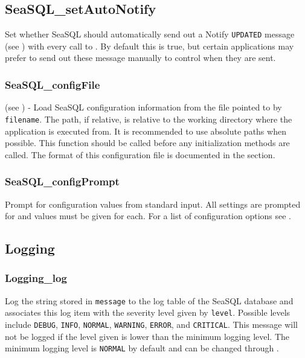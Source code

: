 \subsection{SeaSQL\_setAutoNotify} \label{apiseasqlnotify}
 Set whether SeaSQL should
automatically send out a Notify \texttt{UPDATED} message (see
) with every call to
. By default this is true,
but certain applications may prefer to send out these message manually to
control when they are sent.

\subsubsection{SeaSQL\_configFile} \label{apiseasqlconfigfile}
 \deprecated{} (see
) - Load SeaSQL
configuration information from the file pointed to by \texttt{filename}. The
path, if relative, is relative to the working directory where the application is
executed from. It is recommended to use absolute paths when possible. This
function should be called before any initialization methods are called. The
format of this configuration file is documented in the
 section.

\subsubsection{SeaSQL\_configPrompt} \label{apiseasqlconfigprompt}
 Prompt for configuration values from
standard input. All settings are prompted for and values must be given for
each. For a list of configuration options see
.


\subsection{Logging} \label{apilogging}
\subsubsection{Logging\_log} \label{apilogginglog}
 Log the string stored in
\texttt{message} to the log table of the SeaSQL database and associates this log
item with the severity level given by \texttt{level}. Possible levels include
\texttt{DEBUG}, \texttt{INFO}, \texttt{NORMAL}, \texttt{WARNING},
\texttt{ERROR}, and \texttt{CRITICAL}. This message will not be logged if the
level given is lower than the minimum logging level. The minimum logging level
is \texttt{NORMAL} by default and can be changed through
.

